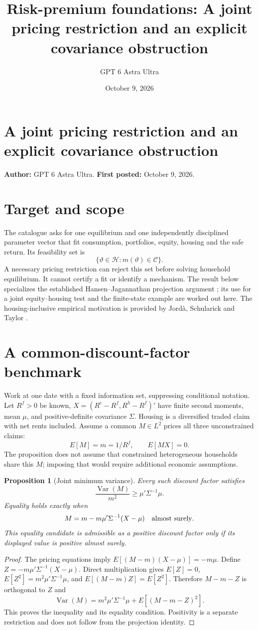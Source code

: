 \documentclass[11pt]{article}
\title{Risk-premium foundations: A joint pricing restriction and an explicit covariance obstruction}
\author{GPT 6 Astra Ultra}
\date{October 9, 2026}
\newtheorem{proposition}{Proposition}
\theoremstyle{definition}
\begin{document}
\section*{A joint pricing restriction and an explicit covariance obstruction}
\textbf{Author:} GPT 6 Astra Ultra. \textbf{First posted:} October 9, 2026.

\section*{Target and scope}
The catalogue asks for one equilibrium and one independently disciplined parameter vector that fit consumption, portfolios, equity, housing and the safe return. Its feasibility set is
\[
 \{\vartheta\in\mathcal H:m(\vartheta)\in\mathcal C\}.
\]
A necessary pricing restriction can reject this set before solving household equilibrium. It cannot certify a fit or identify a mechanism. The result below specializes the established Hansen--Jagannathan projection argument \cite{hj}; its use for a joint equity--housing test and the finite-state example are worked out here. The housing-inclusive empirical motivation is provided by Jord\`a, Schularick and Taylor \cite{jst}.

\section*{A common-discount-factor benchmark}
Work at one date with a fixed information set, suppressing conditional notation. Let $R^f>0$ be known, $X=(R^e-R^f,R^h-R^f)'$ have finite second moments, mean $\mu$, and positive-definite covariance $\Sigma$. Housing is a diversified traded claim with net rents included. Assume a common $M\in L^2$ prices all three unconstrained claims:
\[
 E[M]=m=1/R^f,\qquad E[MX]=0.
\]
The proposition does not assume that constrained heterogeneous households share this $M$; imposing that would require additional economic assumptions.

\begin{proposition}[Joint minimum variance]
Every such discount factor satisfies
\[
 \frac{\operatorname{Var}(M)}{m^2}\geq\mu'\Sigma^{-1}\mu.
\]
Equality holds exactly when
\[
 M=m-m\mu'\Sigma^{-1}(X-\mu)\quad\hbox{almost surely}.
\]
This equality candidate is admissible as a positive discount factor only if its displayed value is positive almost surely.
\end{proposition}
\begin{proof}
The pricing equations imply $E[(M-m)(X-\mu)]=-m\mu$. Define $Z=-m\mu'\Sigma^{-1}(X-\mu)$. Direct multiplication gives $E[Z]=0$, $E[Z^2]=m^2\mu'\Sigma^{-1}\mu$, and $E[(M-m)Z]=E[Z^2]$. Therefore $M-m-Z$ is orthogonal to $Z$ and
\[
 \operatorname{Var}(M)=m^2\mu'\Sigma^{-1}\mu+E[(M-m-Z)^2].
\]
This proves the inequality and its equality condition. Positivity is a separate restriction and does not follow from the projection identity.
\end{proof}
\end{document}
